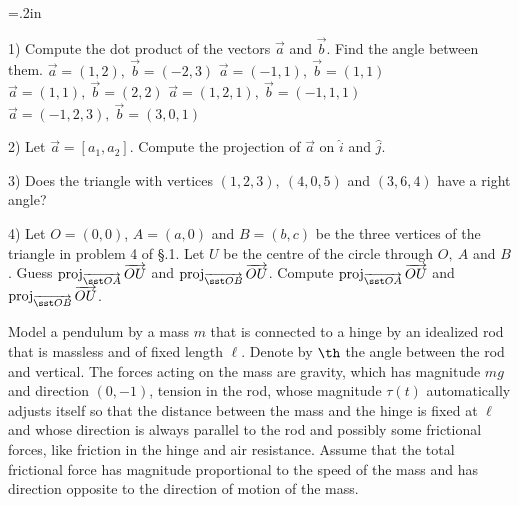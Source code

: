 {\parindent=.2in
\item{1)} Compute the dot product of the vectors $\vec a$ and $\vec b$.
Find the angle between them.
 $\vec a=(1,2),\ \vec b=(-2,3)$
 $\vec a=(-1,1),\ \vec b=(1,1)$
 $\vec a=(1,1),\ \vec b=(2,2)$
 $\vec a=(1,2,1),\ \vec b=(-1,1,1)$
 $\vec a=(-1,2,3),\ \vec b=(3,0,1)$
\smallskip\goodbreak
\item{2)} Let $\vec a=[a_1,a_2]$. Compute the projection of $\vec a$ on
$\hat i$ and $\hat j$.
\smallskip
\item{3)} Does the triangle with vertices $(1,2,3),\ (4,0,5)$ and $(3,6,4)$
have a right angle?
\smallskip
\item{4)} Let $O=(0,0)$, $A=(a,0)$ and $B=(b,c)$ be the three vertices
of the triangle in problem 4 of \S \CH.1. Let $U$ be the centre of the
circle through $O,\ A$ and $B$. Guess 
${\rm proj}_{\overrightarrow{\sst OA}}\,
\overrightarrow{OU}$ and ${\rm proj}_{\overrightarrow{\sst OB}}\,
\overrightarrow{OU}$. Compute ${\rm proj}_{\overrightarrow{\sst OA}}\,
\overrightarrow{OU}$ and ${\rm proj}_{\overrightarrow{\sst OB}}\,
\overrightarrow{OU}$. 

}

Model a pendulum by a mass $m$ that is connected to a hinge by an idealized
rod that is massless and of fixed length $\ell$. Denote by $\th$ the angle
between the rod and vertical. The forces acting on the mass are
gravity, which has magnitude $mg$ and direction $(0,-1)$, tension in the
rod, whose magnitude $\tau(t)$ automatically adjusts itself so that the distance
between the mass and the hinge is fixed at $\ell$ and whose direction
is always parallel to the rod and possibly some frictional
forces, like friction in the hinge and air resistance. Assume
that the total frictional force has magnitude proportional to the speed of the 
mass and has direction opposite to the direction of motion of the mass.


